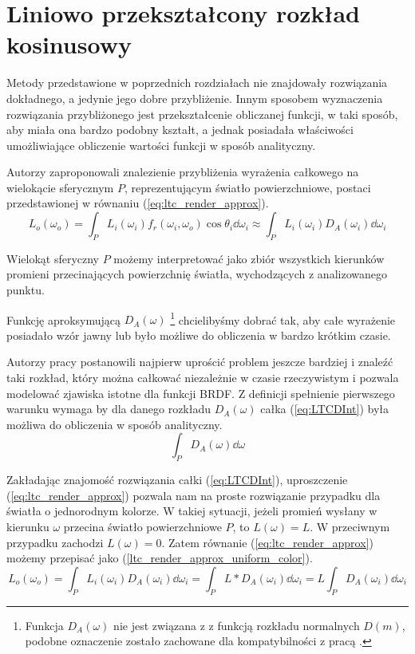 \documentclass[../main.tex]{subfiles}
\begin{document}
\chapter{Liniowo przekształcony rozkład kosinusowy}
\label{Chapter:LTC}

Metody przedstawione w poprzednich rozdziałach nie znajdowały rozwiązania dokładnego, a jedynie jego dobre przybliżenie. Innym sposobem wyznaczenia rozwiązania przybliżonego jest przekształcenie obliczanej funkcji, w taki sposób, aby miała ona bardzo podobny kształt, a jednak posiadała właściwości umożliwiające obliczenie wartości funkcji w sposób analityczny.

Autorzy \cite{ltc_heitz} zaproponowali znalezienie przybliżenia wyrażenia całkowego na wielokącie sferycznym $P$, reprezentującym światło powierzchniowe, postaci przedstawionej w równaniu (\ref{eq:ltc_render_approx}).
\begin{equation}
L_o(\omega_o) = \int_{P} {
  L_i(\omega_i)
  f_r(\omega_i, \omega_o)
  \cos \theta_i
  \dd \omega_i
}
\approx
\int_{P} {
  L_i(\omega_i)
  D_A(\omega_i)
  \dd \omega_i
}
\label{eq:ltc_render_approx}
\end{equation}

Wielokąt sferyczny $P$ możemy interpretować jako zbiór wszystkich kierunków promieni przecinających powierzchnię światła, wychodzących z analizowanego punktu.

Funkcję aproksymującą $D_A(\omega)$ \footnote{Funkcja $D_A(\omega)$ nie jest związana z z funkcją rozkładu normalnych $D(m)$, podobne oznaczenie zostało zachowane dla kompatybilności z pracą \cite{ltc_heitz}.} chcielibyśmy dobrać tak, aby całe wyrażenie posiadało wzór jawny lub było możliwe do obliczenia w bardzo krótkim czasie.

Autorzy pracy \cite{ltc_heitz} postanowili najpierw uprościć problem jeszcze bardziej i znaleźć taki rozkład, który można całkować niezależnie w czasie rzeczywistym i pozwala modelować zjawiska istotne dla funkcji BRDF. Z definicji spełnienie pierwszego warunku wymaga by dla danego rozkładu $D_A(\omega)$ całka  (\ref{eq:LTCDInt}) była możliwa do obliczenia w sposób analityczny.
\begin{equation}
\int_P {
    D_A(\omega)
    \dd \omega
}
\label{eq:LTCDInt}
\end{equation}

Zakładając znajomość rozwiązania całki (\ref{eq:LTCDInt}), uproszczenie (\ref{eq:ltc_render_approx}) pozwala nam na proste rozwiązanie przypadku dla światła o jednorodnym kolorze. W takiej sytuacji, jeżeli promień wysłany w kierunku $\omega$ przecina światło powierzchniowe $P$, to $L(\omega)=L$. W przeciwnym przypadku zachodzi $L(\omega)=0$. Zatem równanie (\ref{eq:ltc_render_approx}) możemy przepisać jako (\ref{ltc_render_approx_uniform_color}).
\begin{equation}
L_o(\omega_o) =
\int_{P} {
    L_i(\omega_i)
    D_A(\omega_i)
    \dd \omega_i
} = \int_{P} {
    L *
    D_A(\omega_i)
    \dd \omega_i
} = L \int_{P} {
    D_A(\omega_i)
    \dd \omega_i
}
\label{ltc_render_approx_uniform_color}
\end{equation}
\end{document}
